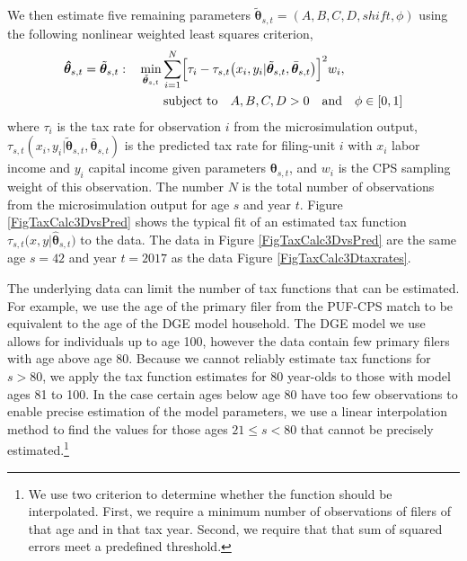   We then estimate five remaining parameters $\tilde{\bm{\theta}}_{s,t}=(A,B,C,D,shift,\phi)$ using the following nonlinear weighted least squares criterion,
  \begin{equation}\label{EqTaxCalcThetaWSSQ}
    \begin{split}
      \bm{\hat{\theta}}_{s,t} = \tilde{\bm{\theta}}_{s,t}:\quad &\min_{\tilde{\bm{\theta}}_{s,t}}\sum_{i=1}^{N} \Bigl[\tau_{i}-\tau_{s,t}\bigl(x_i,y_i|\tilde{\bm{\theta}}_{s,t},\bar{\bm{\theta}}_{s,t}\bigr)\Bigr]^{2} w_i, \\
      &\qquad\text{subject to}\quad A, B, C, D > 0 \quad\text{and}\quad \phi\in[0,1]
    \end{split}
  \end{equation}
  where $\tau_{i}$ is the tax rate for observation $i$ from the microsimulation output, $\tau_{s,t}(x_i,y_i|\tilde{\bm{\theta}}_{s,t},\bar{\bm{\theta}}_{s,t})$ is the predicted tax rate for filing-unit $i$ with $x_{i}$ labor income and $y_{i}$ capital income given parameters $\bm{\theta}_{s,t}$, and $w_{i}$ is the CPS sampling weight of this observation. The number $N$ is the total number of observations from the microsimulation output for age $s$ and year $t$. Figure \ref{FigTaxCalc3DvsPred} shows the typical fit of an estimated tax function $\tau_{s,t}\bigl(x,y|\hat{\bm{\theta}}_{s,t}\bigr)$ to the data. The data in Figure \ref{FigTaxCalc3DvsPred} are the same age $s=42$ and year $t=2017$ as the data Figure \ref{FigTaxCalc3Dtaxrates}.

  The underlying data can limit the number of tax functions that can be estimated. For example, we use the age of the primary filer from the PUF-CPS match to be equivalent to the age of the DGE model household. The DGE model we use allows for individuals up to age 100, however the data contain few primary filers with age above age 80. Because we cannot reliably estimate tax functions for $s>80$, we apply the tax function estimates for 80 year-olds to those with model ages 81 to 100. In the case certain ages below age 80 have too few observations to enable precise estimation of the model parameters, we use a linear interpolation method to find the values for those ages $21\leq s <80$ that cannot be precisely estimated.\footnote{We use two criterion to determine whether the function should be interpolated. First, we require a minimum number of observations of filers of that age and in that tax year. Second, we require that that sum of squared errors meet a predefined threshold.}

